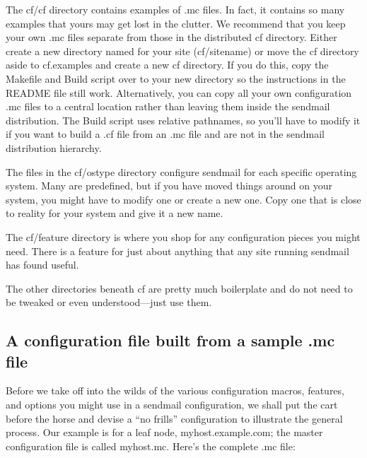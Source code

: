 
The {cf/cf} directory contains examples of {.mc} files. In fact, it
contains so many examples that yours may get lost in the clutter. We
recommend that you keep your own {.mc} files separate from those in the
distributed {cf} directory. Either create a new directory named for your
site ({cf/}{sitename}) or move the {cf} directory aside to {cf.examples}
and create a new {cf} directory. If you do this, copy the {Makefile} and
{Build} script over to your new directory so the instructions in the
{README} file still work. Alternatively, you can copy all your own
configuration {.mc} files to a central location rather than leaving them
inside the {sendmail} distribution. The {Build} script uses relative
pathnames, so you'll have to modify it if you want to build a {.cf} file
from an {.mc} file and are not in the {sendmail} distribution hierarchy.

The files in the {cf/ostype} directory configure {sendmail} for each
specific operating system. Many are predefined, but if you have moved
things around on your system, you might have to modify one or create a
new one. Copy one that is close to reality for your system and give it a
new name.

The {cf/feature} directory is where you shop for any configuration
pieces you might need. There is a feature for just about anything that
any site running {sendmail} has found useful.

The other directories beneath {cf} are pretty much boilerplate and do
not need to be tweaked or even understood---just use them.

\protect\hypertarget{part0026_split_031.html}{}{}

\hypertarget{part0026_split_031.htmlux5cux23_idContainer1247}{}
\hypertarget{part0026_split_031.htmlux5cux23calibre_pb_30}{%
\subsection[A configuration file built from a sample {.mc}
file]{\texorpdfstring{\protect\hypertarget{part0026_split_031.htmlux5cux23_idTextAnchor1060}{}{}A
configuration file built from a sample {.mc}
file}{A configuration file built from a sample .mc file}}\label{part0026_split_031.htmlux5cux23calibre_pb_30}}

\protect\hypertarget{part0026_split_031.htmlux5cux23_idIndexMarker2511}{}{}Before
we take off into the wilds of the various configuration macros,
features, and options you might use in a {sendmail} configuration, we
shall put the cart before the horse and devise a ``no frills''
configuration to illustrate the general process. Our example is for a
leaf node, myhost.example.com; the master configuration file is called
{myhost.mc}. Here's the complete {.mc} file:

